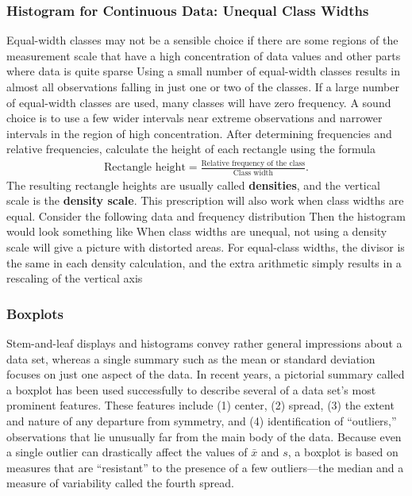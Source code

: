\documentclass{report}
\begin{document}
\subsubsection{Histogram for Continuous Data: Unequal Class Widths}
\bigbreak \noindent 
Equal-width classes may not be a sensible choice if there are some regions of
the measurement scale that have a high concentration of data values and other parts
where data is quite sparse
\bigbreak \noindent 
Using a small number of equal-width classes results in almost all observations falling in just one or two of the classes. If a large number of equal-width
classes are used, many classes will have zero frequency. A sound choice is to use a
few wider intervals near extreme observations and narrower intervals in the region
of high concentration.
\bigbreak \noindent 
After determining frequencies and relative frequencies, calculate the height of
each rectangle using the formula
\begin{align*}
    \text{Rectangle height} = \frac{\text{Relative frequency of the class}}{\text{Class width}}
.\end{align*}
The resulting rectangle heights are usually called \textbf{densities}, and the vertical
scale is the \textbf{density scale}. This prescription will also work when class widths
are equal.
\bigbreak \noindent 
Consider the following data and frequency distribution
\bigbreak \noindent 
{}
\bigbreak \noindent 
Then the histogram would look something like
\bigbreak \noindent 
{}
\bigbreak \noindent 
When class widths are unequal, not using a density scale will give a picture
with distorted areas. For equal-class widths, the divisor is the same in each density
calculation, and the extra arithmetic simply results in a rescaling of the vertical axis

\pagebreak 
\subsubsection{Boxplots}
\bigbreak \noindent 
Stem-and-leaf displays and histograms convey rather general impressions about a
data set, whereas a single summary such as the mean or standard deviation focuses
on just one aspect of the data. In recent years, a pictorial summary called a boxplot
has been used successfully to describe several of a data set’s most prominent features. These features include (1) center, (2) spread, (3) the extent and nature of any
departure from symmetry, and (4) identification of “outliers,” observations that lie
unusually far from the main body of the data. Because even a single outlier can drastically affect the values of $\bar{x}$ and $s$, a boxplot is based on measures that are “resistant” to the presence of a few outliers—the median and a measure of variability called
the fourth spread.
\bigbreak \noindent 
\end{document}
